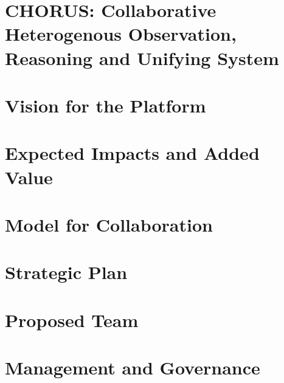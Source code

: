 \documentclass[pdftex,12pt]{article}
\begin{document}
\pagestyle{myheadings}

\section*{CHORUS:  Collaborative Heterogenous Observation, Reasoning and Unifying System}

\section{Vision for the Platform}



\section{Expected Impacts and Added Value}



\section{Model for Collaboration}



\section{Strategic Plan}



\section{Proposed Team}



\section{ Management and Governance }


\end{document}

